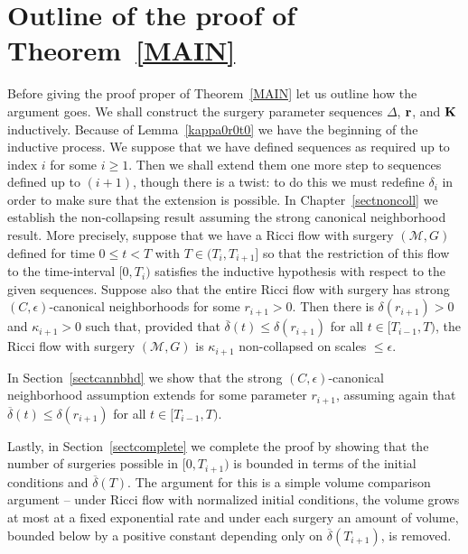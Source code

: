 \section{Outline of the proof of Theorem~{\ref{MAIN}}}

Before giving the proof proper of Theorem~\ref{MAIN} let us outline
how the argument goes. We shall construct the surgery parameter
sequences $\Delta$, ${\bf r}$, and ${\bf K}$ inductively. Because of
Lemma~\ref{kappa0r0t0} we have the beginning of the inductive
process. We suppose that we have defined sequences as required up to
index $i$ for some $i\ge 1$. Then we shall extend them one more step
to sequences defined up to $(i+1)$, though there is a twist: to do
this we must redefine $\delta_i$ in order to make sure that the
extension is possible. In Chapter~\ref{sectnoncoll} we establish the
non-collapsing result assuming the strong canonical neighborhood
result. More precisely, suppose that we have a Ricci flow with
surgery $({\mathcal M},G)$ defined for time $0\le t<T$ with $T\in
(T_i,T_{i+1}]$ so that the restriction of this flow to the
time-interval $[0,T_i)$ satisfies the inductive hypothesis with
respect to the given sequences. Suppose also that the entire Ricci
flow with surgery has
 strong $(C,\epsilon)$-canonical neighborhoods for some $r_{i+1}>0$.
Then there is $\delta(r_{i+1})>0$ and $\kappa_{i+1}>0$ such that,
provided that $\overline\delta(t)\le \delta(r_{i+1})$ for all $t\in
[T_{i-1},T)$, the Ricci flow with surgery $({\mathcal M},G)$ is
$\kappa_{i+1}$ non-collapsed on scales $\le \epsilon$.

In Section~\ref{sectcannbhd} we show that the strong $(C,\epsilon)$-canonical neighborhood
assumption extends for some parameter $r_{i+1}$, assuming again that
$\overline\delta(t)\le \delta(r_{i+1})$ for all $t\in [T_{i-1},T)$.

Lastly, in Section~\ref{sectcomplete} we complete the proof by
showing that the number of surgeries possible in $[0,T_{i+1})$ is
bounded in terms of the initial conditions and $\overline\delta(T)$.
The argument for this is a simple volume comparison argument --
under Ricci flow with normalized initial conditions, the volume
grows at most at a fixed exponential rate and under each surgery an
amount of volume, bounded below by a positive constant depending
only on $\overline \delta(T_{i+1})$, is removed.

